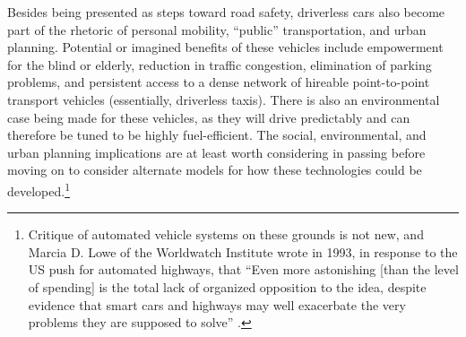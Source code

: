 



Besides being presented as steps toward road safety, driverless cars
also become part of the rhetoric of personal mobility, ``public''
transportation, and urban planning. Potential or imagined
benefits of these vehicles include empowerment for the blind or
elderly, reduction in
traffic congestion, elimination of parking problems, and
persistent access to a dense network of hireable point-to-point
transport vehicles (essentially, driverless taxis). There is
  also an environmental case being made for these vehicles, as they
  will drive predictably and can therefore be tuned to be highly
  fuel-efficient. The social, environmental, and urban planning
implications are at least worth considering in passing before moving
on to consider alternate models for how these technologies could be
developed.\footnote{Critique of automated vehicle systems on these
  grounds is not new, and Marcia D. Lowe of the Worldwatch
    Institute wrote in 1993, in response to
the US push for automated highways, that ``Even more astonishing [than
  the level of spending] is
the total lack of organized opposition to the idea, despite evidence
that smart cars and highways may well exacerbate the very problems
they are supposed to solve'' \cite{novakNationalAutomated}.}

